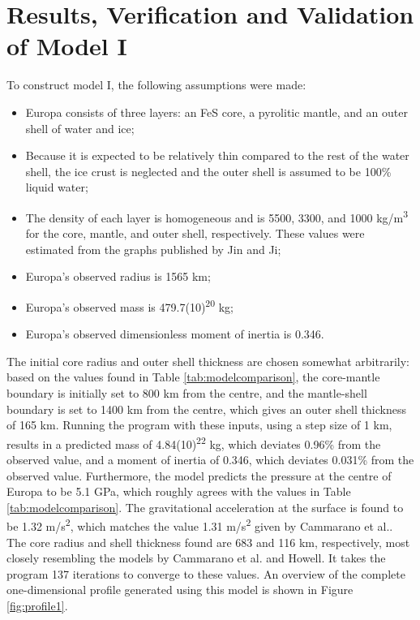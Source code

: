 \documentclass[twocolumn]{article}
\begin{document}
\section{Results, Verification and Validation of Model I}
To construct model I, the following assumptions were made:
\begin{itemize}
	\item Europa consists of three layers: an FeS core, a pyrolitic mantle, and an outer shell of water and ice;
	\item Because it is expected to be relatively thin compared to the rest of the water shell, the ice crust is neglected and the outer shell is assumed to be 100\% liquid water\cite{jinInternalStructureModels2012};
	\item The density of each layer is homogeneous and is 5500, 3300, and 1000 kg/m\textsuperscript{3} for the core, mantle, and outer shell, respectively. These values were estimated from the graphs published by Jin and Ji\cite{jinInternalStructureModels2012};
	\item Europa's observed radius is 1565 km;
	\item Europa's observed mass is 479.7(10)\textsuperscript{20} kg;
	\item Europa's observed dimensionless moment of inertia is 0.346.
\end{itemize}
The initial core radius and outer shell thickness are chosen somewhat arbitrarily: based on the values found in Table \ref{tab:modelcomparison}, the core-mantle boundary is initially set to 800 km from the centre, and the mantle-shell boundary is set to 1400 km from the centre, which gives an outer shell thickness of 165 km. Running the program with these inputs, using a step size of 1 km, results in a predicted mass of 4.84(10)\textsuperscript{22} kg, which deviates 0.96\% from the observed value, and a moment of inertia of 0.346, which deviates 0.031\% from the observed value. Furthermore, the model predicts the pressure at the centre of Europa to be 5.1 GPa, which roughly agrees with the values in Table \ref{tab:modelcomparison}. The gravitational acceleration at the surface is found to be 1.32 m/s\textsuperscript{2}, which matches the value 1.31 m/s\textsuperscript{2} given by Cammarano et al.\cite{cammaranoLongperiodSeismologyEuropa2006}. The core radius and shell thickness found are 683 and 116 km, respectively, most closely resembling the models by Cammarano et al.\cite{cammaranoLongperiodSeismologyEuropa2006} and Howell\cite{howellLikelyThicknessEuropas2021}. It takes the program 137 iterations to converge to these values. An overview of the complete one-dimensional profile generated using this model is shown in Figure \ref{fig:profile1}.\\
\end{document}
